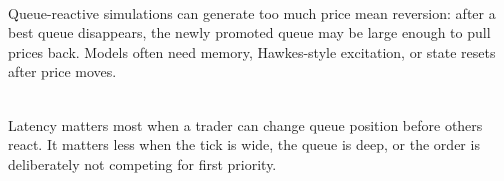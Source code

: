 \begin{caveat} \\
Queue-reactive simulations can generate too much price mean reversion: after a best queue disappears, the newly promoted queue may be large enough to pull prices back. Models often need memory, Hawkes-style excitation, or state resets after price moves.
\end{caveat}

\begin{principle} \\
Latency matters most when a trader can change queue position before others react. It matters less when the tick is wide, the queue is deep, or the order is deliberately not competing for first priority.
\end{principle}
